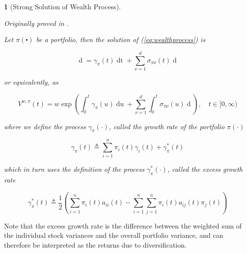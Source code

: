 \documentclass[british]{amsart}
\numberwithin{equation}{section}
\numberwithin{figure}{section}
\theoremstyle{plain}
\theoremstyle{definition}
\theoremstyle{plain}
\theoremstyle{plain}
\theoremstyle{plain}
\newtheorem{prop}[thm]{\protect\propositionname}
\theoremstyle{remark}
\theoremstyle{plain}
\providecommand{\propositionname}{Proposition}
\renewcommand{\d}[1]{\mathop{\mathrm{d}{#1}}}
\newcommand{\ranget}{t\in[0,\infty)}
\newcommand{\defeq}{\mathop{\triangleq}}
\begin{document}
\begin{prop} [Strong Solution of Wealth Process]
	\label{prop:solutionofwealthprocess}

	Originally proved in \cite{fernholz1999pgf}. 

	Let $\pi(\centerdot)$ be a portfolio, then the solution of (\ref{eq:wealthprocess}) is

	\begin{equation}
		\label{eq:wealthprocess}
		\d{V^{w,\pi}(t)} =  
				\gamma_{\pi}(t) \d{t} +
				\sum_{\nu=1}^{d} \sigma_{\pi\nu}(t) \d{W_{\nu}(t)}
	\end{equation}

	or equivalently, as

	\begin{equation}
		V^{w,\pi}(t) = w \exp{ 
			\left(
				\int_{0}^{t} \gamma_{\pi}(u) \d{u} +
				\sum_{\nu=1}^{d} \int_{0}^{t} \sigma_{\pi\nu}(u) \d{W_{\nu}(u)}
			\right)},
	\quad \ranget
	\end{equation}

	where we define the process $\gamma_{\pi}(\cdot)$, called the \textit{growth rate} of the 
	portfolio $\pi(\cdot)$

	\begin{equation}
		\label{eq:portfoliogamma}
		\gamma_{\pi}(t) \defeq \sum_{i=1}^{n} \pi_{i}(t)\gamma_{i}(t) + \gamma_{\pi}^{*}(t)
	\end{equation}

	which in turn uses the definition of the process $\gamma_{\pi}^{*}(\cdot)$, called the
	\textit{excess growth rate}

	\begin{equation}
		\gamma_{\pi}^{*}(t) \defeq \frac{1}{2} 
				\left(
					\sum_{i=1}^{n} \pi_{i}(t)a_{ii}(t) -
					\sum_{i=1}^{n} \sum_{j=1}^{n} \pi_{i}(t)a_{ij}(t)\pi_{j}(t)
				\right)
	\end{equation}

\end{prop}

Note that the excess growth rate is the difference between the weighted sum of the individual stock variances and the overall portfolio variance, and can therefore be interpreted as the returns due to diversification.

\newcommand{\norm}[1]{\left\lVert#1\right\rVert}
\end{document}

